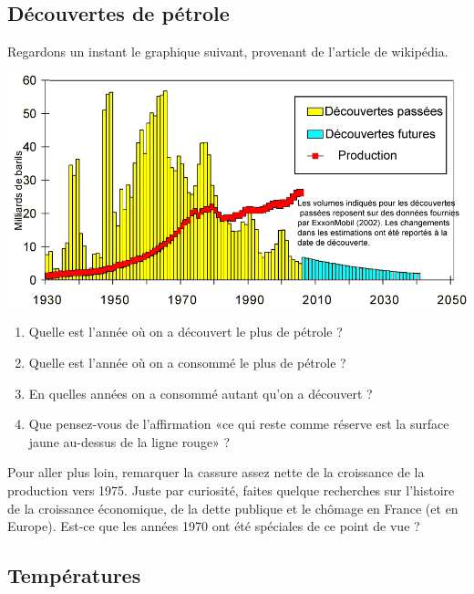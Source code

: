 \subsection{Découvertes de pétrole}

Regardons un instant le graphique suivant, provenant de l'article  de wikipédia.

\includegraphics[width=17cm]{Decouvertes-petrole.png}

\begin{enumerate}
    \item
        Quelle est l'année où on a découvert le plus de pétrole ?
    \item
        Quelle est l'année où on a consommé le plus de pétrole ?
    \item
        En quelles années on a consommé autant qu'on a découvert ?
    \item
        Que pensez-vous de l'affirmation «ce qui reste comme réserve est la surface jaune au-dessus de la ligne rouge» ?
\end{enumerate}
Pour aller plus loin, remarquer la cassure assez nette de la croissance de la production vers 1975. Juste par curiosité, faites quelque recherches sur l'histoire de la croissance économique, de la dette publique et le chômage en France (et en Europe). Est-ce que les années 1970 ont été spéciales de ce point de vue ?

\subsection{Températures}


